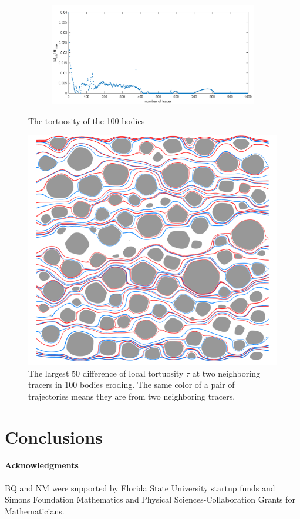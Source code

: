 \documentclass[preprint, 10pt]{elsarticle}
\begin{document}
\begin{figure}[H]
\begin{subfigure}[b]{0.5\textwidth}
\includegraphics*[width =\linewidth]{./figs/uminDumax100}
\caption{}
\end{subfigure}
\caption{\label{fig:Eroding100tort} The tortuosity of the 100 bodies}
\end{figure}

\begin{figure}[H]
\center
\includegraphics*[width =0.5\linewidth]{./figs/tort100b_diff_top50}
\caption{\label{fig:Eroding100tort_traj} The largest 50 difference of 
local tortuosity $\tau$ at two neighboring tracers in
100 bodies eroding. The same color of a pair of trajectories 
means they are from two neighboring tracers.}
\end{figure}
\section{Conclusions}
\label{s:conclusions}


\paragraph{\bf Acknowledgments} BQ and NM were supported by Florida
State University startup funds and Simons Foundation Mathematics and
Physical Sciences-Collaboration Grants for Mathematicians.

 

\end{document}
